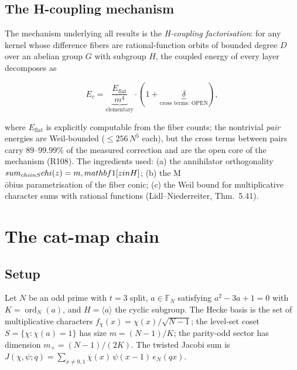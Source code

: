 \documentclass[11pt]{article}
\begin{document}
\subsection{The H-coupling mechanism}

The mechanism underlying all results is the \emph{H-coupling
factorisation}: for any kernel whose difference fibers are
rational-function orbits of bounded degree $D$ over an abelian group
$G$ with subgroup $H$, the coupled energy of every layer decomposes
as

\[
  E_c = \underbrace{\frac{E_{\mathrm{flat}}}{m^4}}_{\text{elementary}}
      \cdot (1 + \underbrace{\delta}_{\text{cross terms: OPEN}}),
\]

where $E_{\mathrm{flat}}$ is explicitly computable from the fiber
counts; the nontrivial \emph{pair} energies are Weil-bounded
($\le 256\,N^5$ each), but the cross terms between pairs carry
$89$--$99.99\%$ of the measured correction and are the open core of
the mechanism (R108).  The ingredients used: (a) the annihilator
orthogonality $\\sum_{\\chi \\in S} \\chi(z) = m\\,\\mathbf{1}[z \\in H]$;
(b) the M\\\"obius parametrisation of the fiber conic; (c) the
Weil bound for multiplicative character sums with rational functions
(Lidl--Niederreiter, Thm.~5.41).

\section{The cat-map chain}\label{sec:catmap}\label{sec:catmap}

\subsection{Setup}

Let $N$ be an odd prime with $t = 3$ split, $a \in \mathbb{F}_N$
satisfying $a^2 - 3a + 1 = 0$ with $K = \operatorname{ord}_N(a)$, and
$H = \langle a\rangle$ the cyclic subgroup.  The Hecke basis is the
set of multiplicative characters $f_\chi(x) = \chi(x)/\sqrt{N-1}$;
the level-set coset $S = \{\chi: \chi(a) = 1\}$ has size
$m = (N{-}1)/K$; the parity-odd sector has dimension
$m_+ = (N{-}1)/(2K)$.  The twisted Jacobi sum is
$J(\chi,\psi;q) = \sum_{x \neq 0,1} \overline{\chi}(x)\,
\psi(x{-}1)\,e_N(qx)$.
\end{document}
